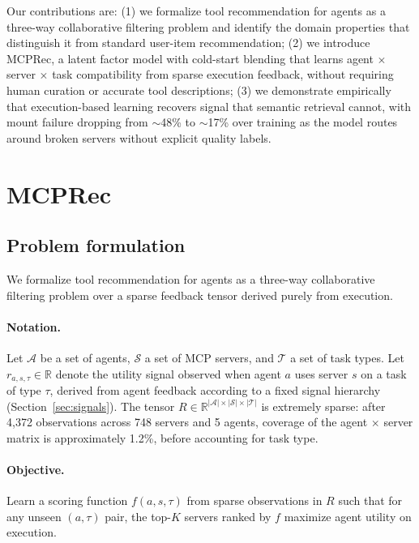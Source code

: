\documentclass{article} %
\begin{document}
Our contributions are: (1) we formalize tool recommendation for agents as a three-way collaborative filtering problem and identify the domain properties that distinguish it from standard user-item recommendation; (2) we introduce MCPRec, a latent factor model with cold-start blending that learns agent $\times$ server $\times$ task compatibility from sparse execution feedback, without requiring human curation or accurate tool descriptions; (3) we demonstrate empirically that execution-based learning recovers signal that semantic retrieval cannot, with mount failure dropping from ${\sim}$48\% to ${\sim}$17\% over training as the model routes around broken servers without explicit quality labels.

\section{MCPRec}
\label{sec:mcprec}

\subsection{Problem formulation}
\label{sec:problem}

We formalize tool recommendation for agents as a three-way collaborative filtering problem over a sparse feedback tensor derived purely from execution.

\paragraph{Notation.} Let $\mathcal{A}$ be a set of agents, $\mathcal{S}$ a set of MCP servers, and $\mathcal{T}$ a set of task types. Let $r_{a,s,\tau} \in \mathbb{R}$ denote the utility signal observed when agent $a$ uses server $s$ on a task of type $\tau$, derived from agent feedback according to a fixed signal hierarchy (Section~\ref{sec:signals}). The tensor $R \in \mathbb{R}^{|\mathcal{A}| \times |\mathcal{S}| \times |\mathcal{T}|}$ is extremely sparse: after 4{,}372 observations across 748 servers and 5 agents, coverage of the agent $\times$ server matrix is approximately 1.2\%, before accounting for task type.

\paragraph{Objective.} Learn a scoring function $f(a, s, \tau)$ from sparse observations in $R$ such that for any unseen $(a, \tau)$ pair, the top-$K$ servers ranked by $f$ maximize agent utility on execution.
\end{document}
